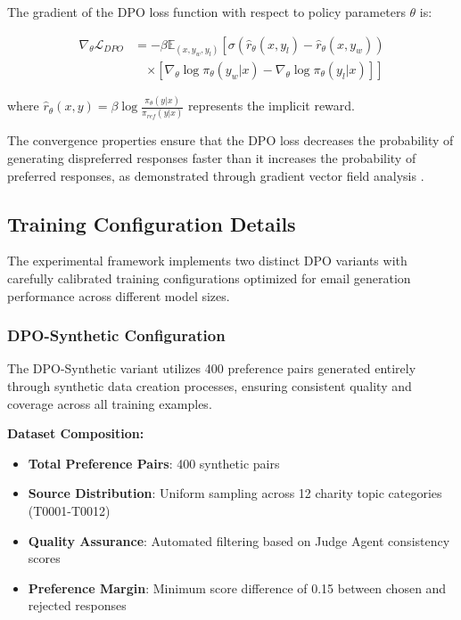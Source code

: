 The gradient of the DPO loss function with respect to policy parameters $\theta$ is:

\begin{align}
\nabla_\theta \mathcal{L}_{DPO} &= -\beta \mathbb{E}_{(x,y_w,y_l)} \left[ \sigma \left( \hat{r}_\theta(x, y_l) - \hat{r}_\theta(x, y_w) \right) \right. \nonumber \\
&\quad \left. \times \left[ \nabla_\theta \log \pi_\theta(y_w|x) - \nabla_\theta \log \pi_\theta(y_l|x) \right] \right] \label{eq:dpo-gradient}
\end{align}

where $\hat{r}_\theta(x, y) = \beta \log \frac{\pi_\theta(y|x)}{\pi_{ref}(y|x)}$ represents the implicit reward.

The convergence properties ensure that the DPO loss decreases the probability of generating dispreferred responses faster than it increases the probability of preferred responses, as demonstrated through gradient vector field analysis \cite{feng2024dpo_theoretical_analysis}.

\subsection{Training Configuration Details}
\label{subsec:dpo-training-configurations}

The experimental framework implements two distinct DPO variants with carefully calibrated training configurations optimized for email generation performance across different model sizes.

\subsubsection{DPO-Synthetic Configuration}

The DPO-Synthetic variant utilizes 400 preference pairs generated entirely through synthetic data creation processes, ensuring consistent quality and coverage across all training examples.

\textbf{Dataset Composition:}
\begin{itemize}
    \item \textbf{Total Preference Pairs}: 400 synthetic pairs
    \item \textbf{Source Distribution}: Uniform sampling across 12 charity topic categories (T0001-T0012)
    \item \textbf{Quality Assurance}: Automated filtering based on Judge Agent consistency scores
    \item \textbf{Preference Margin}: Minimum score difference of 0.15 between chosen and rejected responses
\end{itemize}

